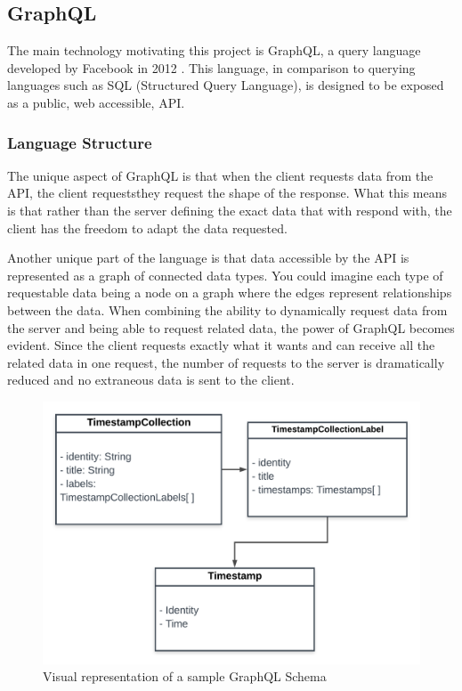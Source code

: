 \subsection{GraphQL}
The main technology motivating this project is GraphQL, a query language developed by Facebook in 2012 \cite{byronKeynoteBriefHistory2019}.  This language, in comparison to querying languages such as SQL (Structured Query Language), is designed to be exposed as a public, web accessible, API.

\subsubsection{Language Structure}

The unique aspect of GraphQL is that when the client requests data from the API, the client requeststhey request the shape of the response.  What this means is that rather than the server defining the exact data that with respond with, the client has the freedom to adapt the data requested.

Another unique part of the language is that data accessible by the API is represented as a graph of connected data types.  You could imagine each type of requestable data being a node on a graph where the edges represent relationships between the data.  When combining the ability to dynamically request data from the server and being able to request related data, the power of GraphQL becomes evident.  Since the client requests exactly what it wants and can receive all the related data in one request, the number of requests to the server is dramatically reduced and no extraneous data is sent to the client.

\begin{figure}[htbp]
    \centering
    \includegraphics[scale=.15]{img/schema-graph.png}
    \caption{Visual representation of a sample GraphQL Schema}
    \label{fig:schema-graph}
\end{figure}

